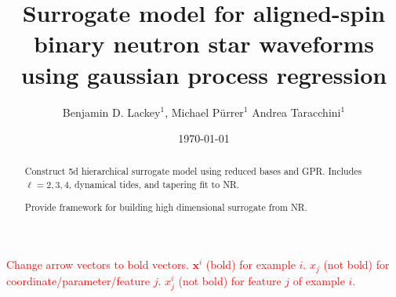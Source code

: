 \documentclass[prd,aps,letter,twocolumn,floatfix,notitlepage]{revtex4-1}
\newcommand{\red}[1]{\textcolor{red}{#1}}
\begin{document}
\title{Surrogate model for aligned-spin binary neutron star waveforms using gaussian process regression}

\author{
Benjamin D. Lackey$^1$, 
Michael P\"{u}rrer$^1$
Andrea Taracchini$^1$
}

\date{\today}

\begin{abstract}

Construct 5d hierarchical surrogate model using reduced bases and GPR. Includes $\ell=2,3,4$, dynamical tides, 
and tapering fit to NR.

Provide framework for building high dimensional surrogate from NR.


\end{abstract}


\maketitle




\red{Change arrow vectors to bold vectors. ${\bm x}^i$ (bold) for example $i$. $x_j$ (not bold) for coordinate/parameter/feature $j$. 
$x_j^i$ (not bold) for feature $j$ of example $i$.}
\end{document}
